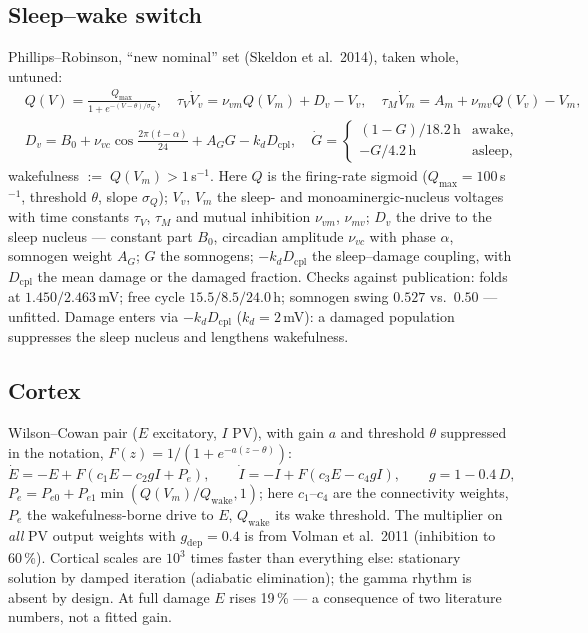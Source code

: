 \documentclass[11pt,a4paper]{article}
\theoremstyle{remark}
\begin{document}
\subsection{Sleep--wake switch}\label{sec:sleep}
Phillips--Robinson, ``new nominal'' set (Skeldon et al.\ 2014), taken whole, untuned:
\begin{equation}\label{eq:pr}
\begin{aligned}
&Q(V)=\frac{Q_{\max}}{1+e^{-(V-\theta)/\sigma_Q}},\quad
\tau_V\dot V_v=\nu_{vm}Q(V_m)+D_v-V_v,\quad
\tau_M\dot V_m=A_m+\nu_{mv}Q(V_v)-V_m,\\
&D_v=B_0+\nu_{vc}\cos\tfrac{2\pi(t-\alpha)}{24}+A_G G-k_d D_{\mathrm{cpl}},\quad
\dot G=\begin{cases}(1-G)/18.2\,\mathrm{h}&\text{awake},\\-G/4.2\,\mathrm{h}&\text{asleep},\end{cases}
\end{aligned}
\end{equation}
wakefulness $:=\;Q(V_m)>1$\,s$^{-1}$. Here $Q$ is the firing-rate sigmoid
($Q_{\max}=100$\,s$^{-1}$, threshold $\theta$, slope $\sigma_Q$); $V_v$, $V_m$ the
sleep- and monoaminergic-nucleus voltages with time constants $\tau_V$, $\tau_M$ and mutual
inhibition $\nu_{vm}$, $\nu_{mv}$;
$D_v$ the drive to the sleep nucleus --- constant part $B_0$, circadian amplitude
$\nu_{vc}$ with phase $\alpha$, somnogen weight $A_G$; $G$ the somnogens;
$-k_d D_{\mathrm{cpl}}$ the sleep--damage coupling, with $D_{\mathrm{cpl}}$ the mean
damage or the damaged fraction. Checks against publication: folds at
$1.450/2.463$\,mV; free cycle $15.5/8.5/24.0$\,h; somnogen swing
$0.527$ vs.\ $0.50$ --- unfitted. Damage enters via $-k_d D_{\mathrm{cpl}}$
($k_d=2$\,mV): a damaged population suppresses the sleep nucleus and lengthens
wakefulness.

\subsection{Cortex}\label{sec:cortex}
Wilson--Cowan pair ($E$ excitatory, $I$ PV), with gain $a$ and threshold $\theta$ suppressed
in the notation, $F(z)=1/(1+e^{-a(z-\theta)})$:
\begin{equation}\label{eq:wc}
\dot E=-E+F(c_1E-c_2gI+P_e),\qquad
\dot I=-I+F(c_3E-c_4gI),\qquad
g=1-0.4\,D,
\end{equation}
$P_e=P_{e0}+P_{e1}\min(Q(V_m)/Q_{\mathrm{wake}},1)$; here $c_1$--$c_4$ are the
connectivity weights, $P_e$ the wakefulness-borne drive to $E$, $Q_{\mathrm{wake}}$ its
wake threshold. The multiplier on \emph{all} PV
output weights with $g_{\mathrm{dep}}=0.4$ is from Volman et al.\ 2011 (inhibition to
60\,\%). Cortical scales are $10^3$ times faster than everything else: stationary
solution by damped iteration (adiabatic elimination); the gamma rhythm is absent by
design. At full damage $E$ rises 19\,\% --- a consequence of two literature numbers,
not a fitted gain.
\end{document}
